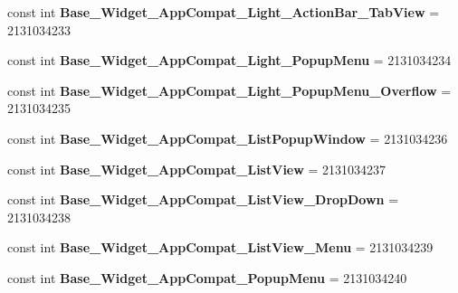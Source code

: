 \begin{DoxyCompactItemize}
\item 
\hypertarget{classClient_1_1Droid_1_1Resource_1_1Style_a2c2af712356bde1841581639193cb2d0}{}const int {\bfseries Base\+\_\+\+Widget\+\_\+\+App\+Compat\+\_\+\+Light\+\_\+\+Action\+Bar\+\_\+\+Tab\+View} = 2131034233\label{classClient_1_1Droid_1_1Resource_1_1Style_a2c2af712356bde1841581639193cb2d0}

\item 
\hypertarget{classClient_1_1Droid_1_1Resource_1_1Style_af1408b25b22c56bb8c8ab8cf8f46c035}{}const int {\bfseries Base\+\_\+\+Widget\+\_\+\+App\+Compat\+\_\+\+Light\+\_\+\+Popup\+Menu} = 2131034234\label{classClient_1_1Droid_1_1Resource_1_1Style_af1408b25b22c56bb8c8ab8cf8f46c035}

\item 
\hypertarget{classClient_1_1Droid_1_1Resource_1_1Style_af346f7e6e5d98bc5de356ebb7b5a4ecb}{}const int {\bfseries Base\+\_\+\+Widget\+\_\+\+App\+Compat\+\_\+\+Light\+\_\+\+Popup\+Menu\+\_\+\+Overflow} = 2131034235\label{classClient_1_1Droid_1_1Resource_1_1Style_af346f7e6e5d98bc5de356ebb7b5a4ecb}

\item 
\hypertarget{classClient_1_1Droid_1_1Resource_1_1Style_a07e1f77879057c02f73cdf40c34d5a16}{}const int {\bfseries Base\+\_\+\+Widget\+\_\+\+App\+Compat\+\_\+\+List\+Popup\+Window} = 2131034236\label{classClient_1_1Droid_1_1Resource_1_1Style_a07e1f77879057c02f73cdf40c34d5a16}

\item 
\hypertarget{classClient_1_1Droid_1_1Resource_1_1Style_a73d5296523ab5e66aac3a57ef2395ec7}{}const int {\bfseries Base\+\_\+\+Widget\+\_\+\+App\+Compat\+\_\+\+List\+View} = 2131034237\label{classClient_1_1Droid_1_1Resource_1_1Style_a73d5296523ab5e66aac3a57ef2395ec7}

\item 
\hypertarget{classClient_1_1Droid_1_1Resource_1_1Style_acebf36908a7aebdd6aca38e05cc96972}{}const int {\bfseries Base\+\_\+\+Widget\+\_\+\+App\+Compat\+\_\+\+List\+View\+\_\+\+Drop\+Down} = 2131034238\label{classClient_1_1Droid_1_1Resource_1_1Style_acebf36908a7aebdd6aca38e05cc96972}

\item 
\hypertarget{classClient_1_1Droid_1_1Resource_1_1Style_a03cd97fe5995964c7e5fe542a96b6614}{}const int {\bfseries Base\+\_\+\+Widget\+\_\+\+App\+Compat\+\_\+\+List\+View\+\_\+\+Menu} = 2131034239\label{classClient_1_1Droid_1_1Resource_1_1Style_a03cd97fe5995964c7e5fe542a96b6614}

\item 
\hypertarget{classClient_1_1Droid_1_1Resource_1_1Style_a513d074c75d70553432f95bfed027d6d}{}const int {\bfseries Base\+\_\+\+Widget\+\_\+\+App\+Compat\+\_\+\+Popup\+Menu} = 2131034240\label{classClient_1_1Droid_1_1Resource_1_1Style_a513d074c75d70553432f95bfed027d6d}


\end{DoxyCompactItemize}
